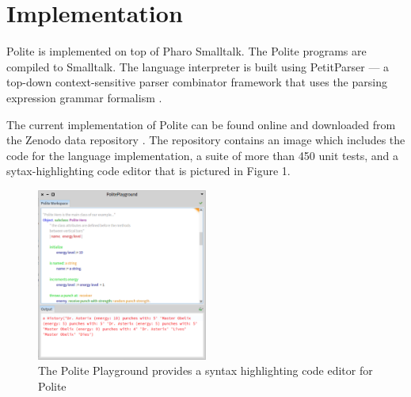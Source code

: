 

\section{Implementation}
Polite is implemented on top of Pharo Smalltalk. The Polite programs are compiled to Smalltalk. The language interpreter is built using PetitParser --- a top-down context-sensitive parser combinator framework that uses the parsing expression grammar formalism  \cite{Kurs14a-ParsingContext}. 



The current implementation of Polite can be found online and downloaded from  the Zenodo data repository \cite{kurs16-polite}. The repository contains an image which includes the code for the language implementation, a suite of more than 450 unit tests, and a sytax-highlighting code editor that is pictured in Figure 1. 

\begin{figure}[h]
	\centering
	\includegraphics[width=0.5\textwidth]{images/playground.png}
	\caption{The Polite Playground provides a syntax highlighting code editor for Polite}
	\label{fig:figure1}
\end{figure}